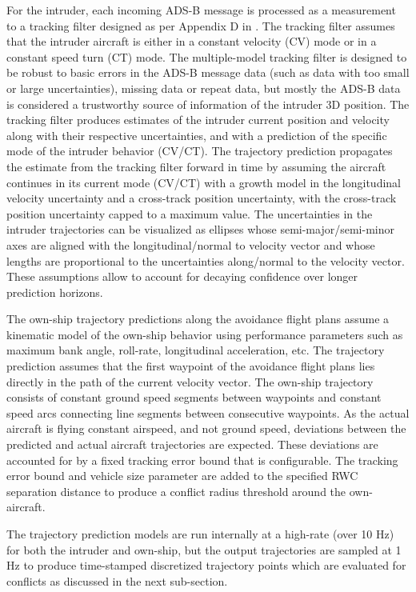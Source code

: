 For the intruder, each incoming ADS-B message is processed as a measurement to a tracking filter designed as per Appendix D in \cite{DO_366A}. The tracking filter assumes that the intruder aircraft is either in a constant velocity (CV) mode or in a constant speed turn (CT) mode. The multiple-model tracking filter is designed to be robust to basic errors in the ADS-B message data (such as data with too small or large uncertainties), missing data or repeat data, but mostly the ADS-B data is considered a trustworthy source of information of the intruder 3D position. The tracking filter produces estimates of the intruder current position and velocity along with their respective uncertainties, and with a prediction of the specific mode of the intruder behavior (CV/CT). The trajectory prediction propagates the estimate from the tracking filter forward in time by assuming the aircraft continues in its current mode (CV/CT) with a growth model in the longitudinal velocity uncertainty and a cross-track position uncertainty, with the cross-track position uncertainty capped to a maximum value. The uncertainties in the intruder trajectories can be visualized as ellipses whose semi-major/semi-minor axes are aligned with the longitudinal/normal to velocity vector and whose lengths are proportional to the uncertainties along/normal to the velocity vector. These assumptions allow to account for decaying confidence over longer prediction horizons.

The own-ship trajectory predictions along the avoidance flight plans assume a kinematic model of the own-ship behavior using performance parameters such as maximum bank angle, roll-rate, longitudinal acceleration, etc. The trajectory prediction assumes that the first waypoint of the avoidance flight plans lies directly in the path of the current velocity vector. The own-ship trajectory consists of constant ground speed segments between waypoints and constant speed arcs connecting line segments between consecutive waypoints. As the actual aircraft is flying constant airspeed, and not ground speed, deviations between the predicted and actual aircraft trajectories are expected. These deviations are accounted for by a fixed tracking error bound that is configurable. The tracking error bound and vehicle size parameter are added to the specified RWC separation distance to produce a conflict radius threshold around the own-aircraft.

The trajectory prediction models are run internally at a high-rate (over 10 Hz) for both the intruder and own-ship, but the output trajectories are sampled at 1 Hz to produce time-stamped discretized trajectory points which are evaluated for conflicts as discussed in the next sub-section.


